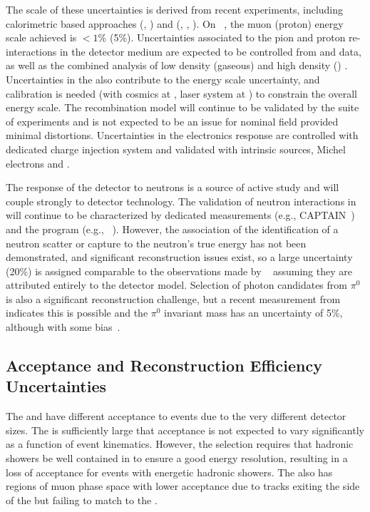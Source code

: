 The scale of these uncertainties is derived from recent experiments, including calorimetric based approaches (, ) and  (, , ). On ~\cite{NOvA:2018gge}, the muon (proton) energy scale achieved is $<1$\% (5\%). Uncertainties associated to the pion and proton re-interactions in the detector medium are expected to be controlled from  and  data, as well as the combined analysis of low density (gaseous) and high density () . Uncertainties in the \efield also contribute to the energy scale uncertainty, and calibration is needed (with cosmics at , laser system at ) to constrain the overall energy scale. The recombination model will continue to be validated by the suite of  experiments and is not expected to be an issue for nominal field provided minimal \efield distortions. Uncertainties in the electronics response are controlled with dedicated charge injection system and validated with intrinsic sources, Michel electrons and .

The response of the detector to neutrons is a source of active study and will couple strongly to detector technology. The validation of neutron interactions in  will continue to be characterized by dedicated measurements (e.g., CAPTAIN~\cite{Berns:2013usa,Bhandari:2019rat}) and the  program (e.g., ~\cite{PhysRevD.99.012002}).  However, the association of the identification of a neutron scatter or capture to the neutron's true energy has not been demonstrated, and significant reconstruction issues exist, so a large uncertainty (20\%) is assigned comparable to the observations made by ~\cite{Elkins:2019vmy} assuming they are attributed entirely to the detector model. Selection of photon candidates from $\pi^0$ is also a significant reconstruction challenge, but a recent measurement from  indicates this is possible and the $\pi^0$ invariant mass has an uncertainty of 5\%, although with some bias~\cite{Adams:2018sgn}.

\subsection{Acceptance and Reconstruction Efficiency Uncertainties}

The  and  have different acceptance to  events due to the very different detector sizes. The  is sufficiently large that acceptance is not expected to vary significantly as a function of event kinematics. However, the  selection requires that hadronic showers be well contained in  to ensure a good energy resolution, resulting in a loss of acceptance for events with energetic hadronic showers. The  also has regions of muon phase space with lower acceptance due to tracks exiting the side of the  but failing to match to the .

